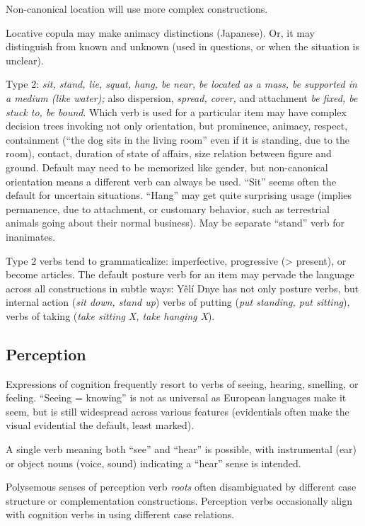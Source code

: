 \documentclass[11pt]{article}
\begin{document}
Non-canonical location will use more complex constructions.  

Locative copula may make animacy distinctions (Japanese).  Or, it may
distinguish from known and unknown (used in questions, or when the
situation is unclear).

Type 2: \textit{sit, stand, lie, squat, hang, be near, be located as a
mass, be supported in a medium (like water);} also dispersion,
\textit{spread, cover,} and attachment \textit{be fixed, be stuck to,
be bound}.  Which verb is used for a particular item may have
complex decision trees invoking not only orientation, but
prominence, animacy, respect, containment (``the dog sits in the
living room'' even if it is standing, due to the room), contact,
duration of state of affairs, size relation between figure and ground.
Default may need to be memorized like gender, but non-canonical
orientation means a different verb can always be used.  ``Sit'' seems
often the default for uncertain situations.  ``Hang'' may get quite
surprising usage (implies permanence, due to attachment, or customary
behavior, such as terrestrial animals going about their normal
business).  May be separate ``stand'' verb for inanimates.

Type 2 verbs tend to grammaticalize: imperfective, progressive (>
present), or become articles.  The default posture verb for an item
may pervade the language across all constructions in subtle ways: Yêlí
Dnye has not only posture verbs, but internal action (\textit{sit
down, stand up}) verbs of putting (\textit{put standing, put
sitting}), verbs of taking (\textit{take sitting X, take hanging
X}).

\subsection{Perception}
Expressions of cognition frequently resort to verbs of seeing,
hearing, smelling, or feeling.  ``Seeing = knowing'' is not as
universal as European languages make it seem, but is still widespread
across various features (evidentials often make the visual evidential
the default, least marked).

A single verb meaning both ``see'' and ``hear'' is possible, with
instrumental (ear) or object nouns (voice, sound) indicating a
``hear'' sense is intended.

Polysemous senses of perception verb \textit{roots} often
disambiguated by different case structure or complementation
constructions.  Perception verbs occasionally align with cognition
verbs in using different case relations.
\end{document}
